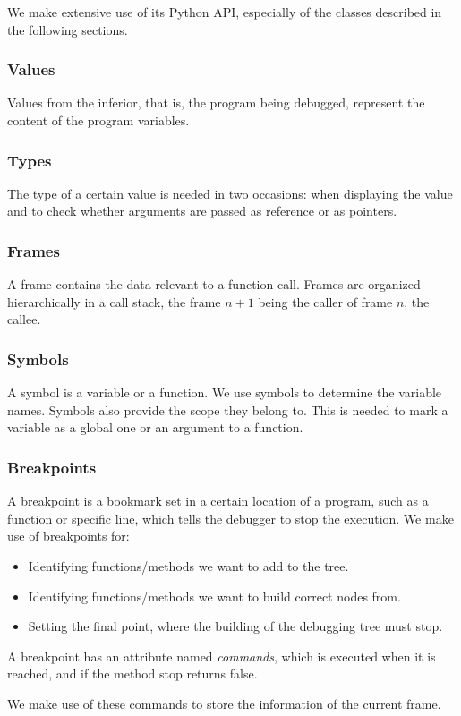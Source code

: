 We make extensive use of its Python API, especially of the classes described in the following sections.

\subsubsection{Values}
Values from the inferior, that is, the program being debugged, represent the content of the program variables.
\subsubsection{Types}
The type of a certain value is needed in two occasions: when displaying the value and to check whether arguments are passed as reference or as pointers.
\subsubsection{Frames}
A frame contains the data relevant to a function call.
Frames are organized hierarchically in a call stack, the frame \(n+1\) being the caller of frame \(n\), the callee.
\subsubsection{Symbols}
A symbol is a variable or a function. We use symbols to determine the variable names. Symbols also provide the scope they belong to. This is needed to mark a variable as a global one or an argument to a function. 
\subsubsection{Breakpoints}
A breakpoint is a bookmark set in a certain location of a program, such as a function or specific line, which tells the debugger to stop the execution.
We make use of breakpoints for:
\begin{itemize}
    \item Identifying functions/methods we want to add to the tree.
    \item Identifying functions/methods we want to build correct nodes from.
    \item Setting the final point, where the building of the debugging tree must stop.
\end{itemize}
A breakpoint has an attribute named \emph{commands}, which is executed when it is reached, and if the method stop returns false.

We make use of these commands to store the information of the current frame.
